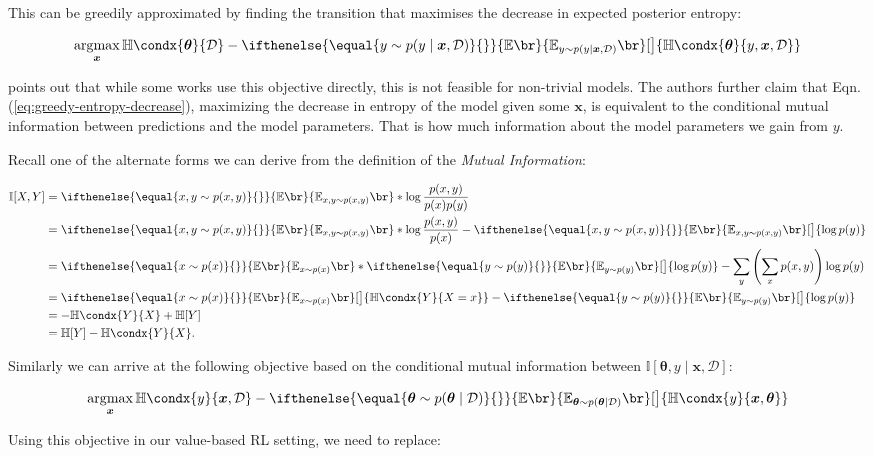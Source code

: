 \documentclass[10pt,a4paper]{article} %
\DeclarePairedDelimiter{\sbr}{[}{]}
\newcommand{\btheta}{\bm{\theta}}
\newcommand{\data}{\ensuremath{\mathcal{D}}}
\newcommand{\argmax}[2]{\underset{#1}{\arg\!\max}\,#2}
\newcommand{\Entropy}{\mathbb{H}\condx}
\newcommand{\Expected}[1][]{
   \ifthenelse{\equal{#1}{}}{\mathbb{E}\br}{\mathbb{E}_{#1}\br}%
}
\begin{document}
This can be greedily approximated by finding the transition that maximises
the decrease in expected posterior entropy:

\begin{equation}
   \argmax{\bm{x}}{\Entropy{\btheta}{\data}} - 
   \Expected[y \sim p(y \mid \bm{x}, \data)][\big]{
      \Entropy{\btheta}{y, \bm{x}, \data}}
   \label{eq:greedy-entropy-decrease}
\end{equation}

\cite{Houlsby2011BayesianAL} points out that while some works use this
objective directly, this is not feasible for non-trivial models. The authors
further claim that Eqn. (\ref{eq:greedy-entropy-decrease}), maximizing the
decrease in entropy of the model given some $\bm{x}$, is equivalent to the
conditional mutual information between predictions and the model parameters.
That is how much information about the model parameters we gain from $y$.

Recall one of the alternate forms we can derive from the definition of the
\textit{Mutual Information}:

\begin{align*}
   \mathbb{I}\sbr*{X, Y}
      & = \Expected[x, y \sim p(x, y)]*{\log \frac{p(x, y)}{p(x) p(y)}} \\
      & = \Expected[x, y \sim p(x, y)]*{\log \frac{p(x, y)}{p(x)}} - 
         \Expected[x, y \sim p(x, y)][\big]{\log p(y)} \\
      & = \Expected[x \sim p(x)]*{\Expected[y \sim p(y)][\big]{\log p(y)}} - 
         \sum_{y} \left( \sum_{x} p(x,y) \right) \log p(y) \\
      & = \Expected[x \sim p(x)][\big]{\Entropy{Y}{X = x}} -
         \Expected[y \sim p(y)][\big]{\log p(y)} \\
      & = -\Entropy{Y}{X} + \mathbb{H}\sbr*{Y} \\
      & = \mathbb{H}\sbr*{Y} - \Entropy{Y}{X}.
\end{align*}

\clearpage
Similarly we can arrive at the following objective based on the conditional
mutual information between $\mathbb{I}\left[ \btheta, y \mid \bm{x},
\data \right]$:

\begin{equation}
   \argmax{\bm{x}}{\Entropy{y}{\bm{x}, \data} -
      \Expected[\btheta \sim p(\btheta \mid \data)][\big]{
         \Entropy{y}{\bm{x}, \btheta}}}
\end{equation}

Using this objective in our value-based RL setting, we need to replace:
\end{document}

